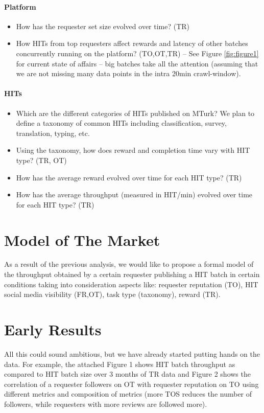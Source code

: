\paragraph{Platform}
\begin{itemize}
	\item How has the requester set size evolved over time? (TR)
	\item How HITs from top requesters affect rewards and latency of other batches concurrently running on the platform? (TO,OT,TR)
	-- See Figure \ref{fig:figure1} for current state of affairs -- big batches take all the attention (assuming that we are not missing many data points in the intra 20min crawl-window).
\end{itemize}

\paragraph{HITs}
\begin{itemize}
	\item Which are the different categories of HITs published on MTurk? We plan to define a taxonomy of common HITs including classification, survey, translation, typing, etc.
	\item Using the taxonomy, how does reward and completion time vary with HIT type? (TR, OT)
	\item How has the average reward evolved over time for each HIT type? (TR)
	\item How has the average throughput (measured in HIT/min) evolved over time for each HIT type? (TR)
\end{itemize}

\section{Model of The Market}
As a result of the previous analysis, we would like to propose a formal model of the throughput obtained by a certain requester publishing a HIT batch in certain conditions taking into consideration aspects like: requester reputation (TO), HIT social media visibility (FR,OT), task type (taxonomy), reward (TR).

\section{Early Results}
All this could sound ambitious, but we have already started putting hands on the data. For example, the attached Figure 1 shows HIT batch throughput as compared to HIT batch size over 3 months of TR data and Figure 2 shows the correlation of a requester followers on OT with requester reputation on TO using different metrics and composition of metrics (more TOS reduces the number of followers, while requesters with more reviews are followed more).

